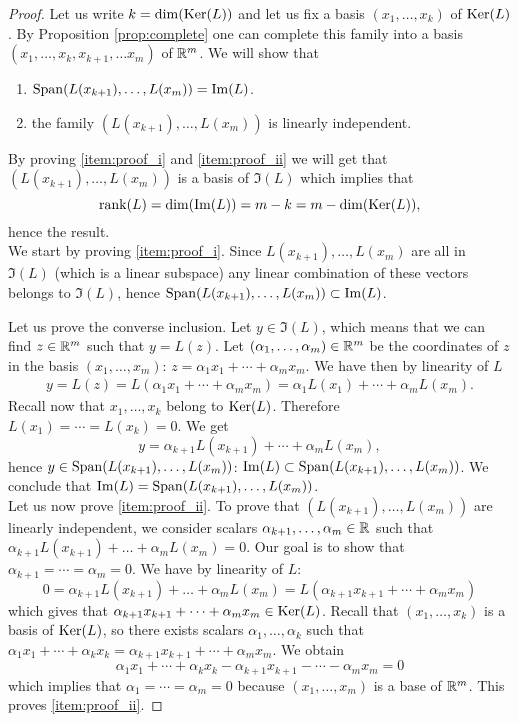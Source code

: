 \documentclass[11pt,nocut]{article}
\begin{document}
\begin{proof}
	Let us write $k = {{\rm dim}}({{\rm Ker}}(L))$ and let us fix a basis $(x_1, \dots, x_k)$ of ${{\rm Ker}}(L)$. By Proposition \ref{prop:complete} one can complete this family into a basis $(x_1, \dots, x_k, x_{k+1}, \dots x_m)$ of $\mathbb{R}^m$.
	We will show that
	\begin{enumerate}[label=(\roman*)]
		\item \label{item:proof_i} ${{\rm Span}}(L(x_{k+1}), \dots, L(x_m)) = {{\rm Im}}(L)$.
		\item \label{item:proof_ii} the family $(L(x_{k+1}), \dots, L(x_{m}))$ is linearly independent.
	\end{enumerate}

	By proving \ref{item:proof_i} and \ref{item:proof_ii} we will get that $(L(x_{k+1}), \dots, L(x_{m}))$ is a basis of $\Im(L)$ which implies that 
	$$
	{{\rm rank}}(L) = {{\rm dim}}({{\rm Im}}(L)) = m - k = m - {{\rm dim}}({{\rm Ker}}(L)),
	$$
	hence the result.
\\

We start by proving \ref{item:proof_i}. Since $L(x_{k+1}), \dots, L(x_m)$ are all in $\Im(L)$ (which is a linear subspace) any linear combination of these vectors belongs to $\Im(L)$, hence ${{\rm Span}}(L(x_{k+1}), \dots, L(x_m)) \subset {{\rm Im}}(L)$.

Let us prove the converse inclusion.
Let $y \in \Im(L)$, which means that we can find $z \in \mathbb{R}^m$ such that $y = L(z)$. Let $(\alpha_1, \dots, \alpha_m) \in \mathbb{R}^m$ be the coordinates of $z$ in the basis $(x_1, \dots, x_m)$: $z = \alpha_1 x_1 + \cdots + \alpha_m x_m$. We have then by linearity of $L$
\begin{align*}
y = L(z) = L(\alpha_1 x_1 + \cdots + \alpha_m x_m)
= \alpha_1 L(x_1) + \cdots + \alpha_m L(x_m).
\end{align*}
Recall now that $x_1, \dots, x_k$ belong to ${{\rm Ker}}(L)$. Therefore $L(x_1) = \cdots = L(x_k) = 0$. We get
$$
y = \alpha_{k+1} L(x_{k+1}) + \cdots + \alpha_{m} L(x_{m}),
$$
hence $y \in {{\rm Span}}(L(x_{k+1}), \dots, L(x_m))$: ${{\rm Im}}(L) \subset {{\rm Span}}(L(x_{k+1}), \dots, L(x_m))$. We conclude that ${{\rm Im}}(L) = {{\rm Span}}(L(x_{k+1}), \dots, L(x_m))$.
\\

Let us now prove \ref{item:proof_ii}. To prove that $(L(x_{k+1}), \dots, L(x_m))$ are linearly independent, we consider scalars $\alpha_{k+1}, \dots, \alpha_m \in \mathbb{R}$ such that $\alpha_{k+1} L(x_{k+1}) + \dots + \alpha_m L(x_m) =0$. Our goal is to show that $\alpha_{k+1} = \cdots = \alpha_m = 0$. We have by linearity of $L$:
$$
0 =\alpha_{k+1} L(x_{k+1}) + \dots + \alpha_m L(x_m) = L(\alpha_{k+1} x_{k+1} + \cdots + \alpha_m x_m)
$$
which gives that $\alpha_{k+1} x_{k+1} + \cdots + \alpha_m x_m \in {{\rm Ker}}(L)$. Recall that $(x_1, \dots, x_k)$ is a basis of ${{\rm Ker}}(L)$, so there exists scalars $\alpha_1, \dots, \alpha_k$ such that $\alpha_1 x_1 + \cdots + \alpha_k x_k = \alpha_{k+1} x_{k+1} + \cdots + \alpha_m x_m$. We obtain
$$
\alpha_1 x_1 + \cdots + \alpha_k x_k - \alpha_{k+1} x_{k+1} - \cdots - \alpha_m x_m = 0
$$
which implies that $\alpha_1 = \cdots = \alpha_m = 0$ because $(x_1, \dots, x_m)$ is a base of $\mathbb{R}^m$. This proves \ref{item:proof_ii}.
\end{proof}
\end{document}
